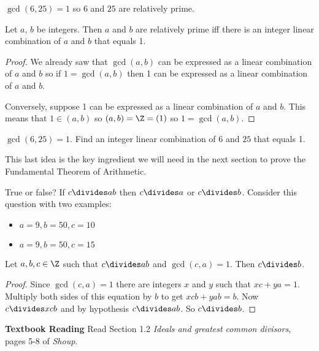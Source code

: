 \documentclass[oneside,12pt]{amsart}
\begin{document}
\begin{in_class_example}
$\gcd(6,25) = 1$ so $6$ and $25$ are relatively prime.
\end{in_class_example}

\begin{theorem}
Let $a$, $b$ be integers. Then $a$ and $b$ are relatively prime iff
there is an integer linear combination of $a$ and $b$ that equals 1.
\end{theorem}
\begin{proof}
We already saw that $\gcd(a,b)$ can be expressed as a linear combination
of $a$ and $b$ so if $1=\gcd(a,b)$ then 1 can be expressed as a linear combination
of $a$ and $b$.

Conversely, suppose 1 can be expressed as a linear combination of $a$ and $b$.
This means that $1\in (a,b)$ so $(a,b) = \Z = (1)$ so $1=\gcd(a,b)$.
\end{proof}

\begin{in_class_example}
$\gcd(6,25) = 1$. Find an integer linear combination of $6$ and $25$
that equals 1.
\end{in_class_example}

This last idea is the key ingredient we will need in the next section to
prove the Fundamental Theorem of Arithmetic.

\begin{in_class_example}
True or false? If $c \divides ab$ then $c\divides a$ or $c \divides b$.
Consider this question with two examples:
\begin{itemize}
\item $a = 9,  b = 50, c = 10$
\item $a = 9,  b = 50, c = 15$
\end{itemize}
\end{in_class_example}

\begin{theorem}
\label{PrePrimeProperty}
Let $a,b,c \in \Z$ such that $c\divides ab$ and $\gcd(c,a) = 1$.
Then $c \divides b$.
\end{theorem}
\begin{proof}
Since $\gcd(c,a) = 1$ there are integers $x$ and $y$ such that
$xc + ya = 1$. Multiply both sides of this equation by $b$ to
get $xcb + yab = b$.  Now $c\divides xcb$ and by hypothesis
$c\divides ab$. So $c\divides b$.
\end{proof}

\bigskip

\textbf{Textbook Reading} Read Section 1.2
\emph{Ideals and greatest common divisors}, pages 5-8 of \emph{Shoup}.
\end{document}
